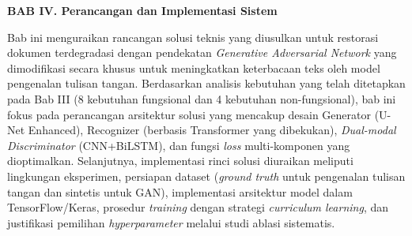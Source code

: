 

\vspace{2cm}
\begin{center}
{\fontsize{14}{16.8}\selectfont\textbf{BAB IV. Perancangan dan Implementasi Sistem}}\\[1em]
\end{center}
\label{sec:analisis}
\setcounter{section}{4}
\setcounter{subsection}{0}
\vspace{2em}
\label{subsec:analisis-desain}
\vspace{0.8em}


\renewcommand{\thesection}{\Roman{section}}
\renewcommand{\thesubsection}{\thesection.\arabic{subsection}}
\renewcommand{\thesubsubsection}{\thesubsection.\arabic{subsubsection}}

Bab ini menguraikan rancangan solusi teknis yang diusulkan untuk restorasi dokumen terdegradasi dengan pendekatan \textit{Generative Adversarial Network} yang dimodifikasi secara khusus untuk meningkatkan keterbacaan teks oleh model pengenalan tulisan tangan. Berdasarkan analisis kebutuhan yang telah ditetapkan pada Bab III (8 kebutuhan fungsional dan 4 kebutuhan non-fungsional), bab ini fokus pada perancangan arsitektur solusi yang mencakup desain Generator (U-Net Enhanced), Recognizer (berbasis Transformer yang dibekukan), \textit{Dual-modal Discriminator} (CNN+BiLSTM), dan fungsi \textit{loss} multi-komponen yang dioptimalkan. Selanjutnya, implementasi rinci solusi diuraikan meliputi lingkungan eksperimen, persiapan dataset (\textit{ground truth} untuk pengenalan tulisan tangan dan sintetis untuk GAN), implementasi arsitektur model dalam TensorFlow/Keras, prosedur \textit{training} dengan strategi \textit{curriculum learning}, dan justifikasi pemilihan \textit{hyperparameter} melalui studi ablasi sistematis.



